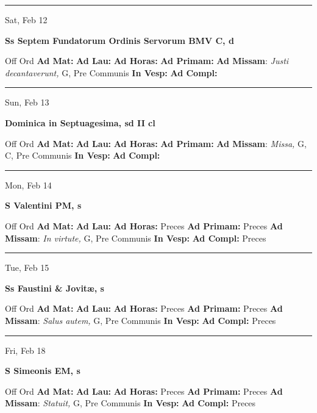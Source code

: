 \documentclass[letterpaper, 10pt]{article}
\begin{document}
\hrule
\begin{center}
Sat, Feb 12
\end{center}\textbf{ \large Ss Septem Fundatorum Ordinis Servorum BMV C, \textnormal{\normalsize d}}
\begin{justify}
Off Ord
\textbf{Ad Mat: }
\textbf{Ad Lau: }
\textbf{Ad Horas: }
\textbf{Ad Primam: }
\textbf{Ad Missam}: \textit{Justi decantaverunt,} G, Pre Communis
\textbf{In Vesp: }
\textbf{Ad Compl: }\end{justify}



\hrule
\begin{center}
Sun, Feb 13
\end{center}\textbf{ \large Dominica in Septuagesima, \textnormal{\normalsize sd II cl}}
\begin{justify}
Off Ord
\textbf{Ad Mat: }
\textbf{Ad Lau: }
\textbf{Ad Horas: }
\textbf{Ad Primam: }
\textbf{Ad Missam}: \textit{Missa,} G, C, Pre Communis
\textbf{In Vesp: }
\textbf{Ad Compl: }\end{justify}



\hrule
\begin{center}
Mon, Feb 14
\end{center}\textbf{ \large S Valentini PM, \textnormal{\normalsize s}}
\begin{justify}
Off Ord
\textbf{Ad Mat: }
\textbf{Ad Lau: }
\textbf{Ad Horas: }Preces
\textbf{Ad Primam: }Preces
\textbf{Ad Missam}: \textit{In virtute,} G, Pre Communis
\textbf{In Vesp: }
\textbf{Ad Compl: }Preces\end{justify}



\hrule
\begin{center}
Tue, Feb 15
\end{center}\textbf{ \large Ss Faustini \& Jovitæ, \textnormal{\normalsize s}}
\begin{justify}
Off Ord
\textbf{Ad Mat: }
\textbf{Ad Lau: }
\textbf{Ad Horas: }Preces
\textbf{Ad Primam: }Preces
\textbf{Ad Missam}: \textit{Salus autem,} G, Pre Communis
\textbf{In Vesp: }
\textbf{Ad Compl: }Preces\end{justify}



\hrule
\begin{center}
Fri, Feb 18
\end{center}\textbf{ \large S Simeonis EM, \textnormal{\normalsize s}}
\begin{justify}
Off Ord
\textbf{Ad Mat: }
\textbf{Ad Lau: }
\textbf{Ad Horas: }Preces
\textbf{Ad Primam: }Preces
\textbf{Ad Missam}: \textit{Statuit,} G, Pre Communis
\textbf{In Vesp: }
\textbf{Ad Compl: }Preces\end{justify}
\end{document}

